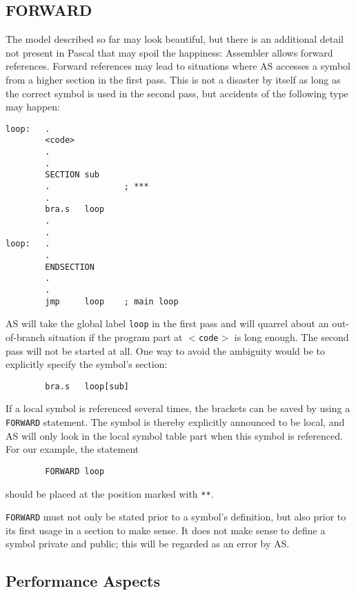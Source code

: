 \documentclass[12pt,twoside]{report}
\makeatletter
\newcommand{\tty}[1]{{\tt #1}}
\newcommand{\ttindex}[1]{\index{#1@{\tt #1}}}
\newcommand{\asname}{{AS}}
\makeatother
\begin{document}

\subsection{FORWARD}
\ttindex{FORWARD}

The model described so far may look beautiful, but there is an
additional detail not present in Pascal that may spoil the happiness:
Assembler allows forward references.  Forward references may lead to
situations where \asname{} accesses a symbol from a higher section in the
first pass.  This is not a disaster by itself as long as the correct
symbol is used in the second pass, but accidents of the following
type may happen:
\begin{verbatim}
loop:   .
        <code>
        .
        .
        SECTION sub
        .               ; ***
        .
        bra.s   loop
        .
        .
loop:   .
        .
        ENDSECTION
        .
        .
        jmp     loop    ; main loop
\end{verbatim}
\asname{} will take the global label \tty{loop} in the first pass and will
quarrel about an out-of-branch situation if the program part at
\tty{$<$code$>$} is long enough.  The second pass will not be
started at all.  One way to avoid the ambiguity would be to
explicitly specify the symbol's section:
\begin{verbatim}
        bra.s   loop[sub]
\end{verbatim}
If a local symbol is referenced several times, the brackets can be saved
by using a \tty{FORWARD} statement.  The symbol is thereby explicitly
announced to be local, and \asname{} will only look in the local symbol table
part when this symbol is referenced.  For our example, the statement
\begin{verbatim}
        FORWARD loop
\end{verbatim}
should be placed at the position marked with \tty{***}.

\tty{FORWARD} must not only be stated prior to a symbol's definition, but
also prior to its first usage in a section to make sense.  It does not
make sense to define a symbol private and public; this will be regarded as
an error by \asname{}.


\subsection{Performance Aspects}
\end{document}
